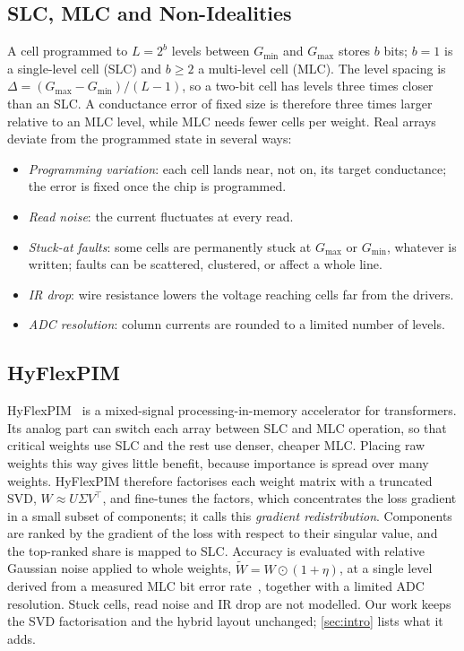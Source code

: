\subsection{SLC, MLC and Non-Idealities}
A cell programmed to $L=2^b$ levels between $G_{\min}$ and $G_{\max}$ stores $b$ bits; $b=1$ is a
single-level cell (SLC) and $b\geq2$ a multi-level cell (MLC). The level spacing is
$\Delta=(G_{\max}-G_{\min})/(L-1)$, so a two-bit cell has levels three times closer than an SLC. A
conductance error of fixed size is therefore three times larger relative to an MLC level, while MLC
needs fewer cells per weight. Real arrays deviate from the programmed state in several ways:
\begin{itemize}
\item \emph{Programming variation}: each cell lands near, not on, its target conductance; the error is
fixed once the chip is programmed.
\item \emph{Read noise}: the current fluctuates at every read.
\item \emph{Stuck-at faults}: some cells are permanently stuck at $G_{\max}$ or $G_{\min}$, whatever
is written; faults can be scattered, clustered, or affect a whole line.
\item \emph{IR drop}: wire resistance lowers the voltage reaching cells far from the drivers.
\item \emph{ADC resolution}: column currents are rounded to a limited number of levels.
\end{itemize}

\subsection{HyFlexPIM}
HyFlexPIM~\cite{song2025hyflexpim} is a mixed-signal processing-in-memory accelerator for
transformers. Its analog part can switch each array between SLC and MLC operation, so that critical
weights use SLC and the rest use denser, cheaper MLC. Placing raw weights this way gives little benefit,
because importance is spread over many weights. HyFlexPIM therefore factorises each weight matrix with a
truncated SVD, $W\approx U\Sigma V^{\top}$, and fine-tunes the factors, which concentrates the loss
gradient in a small subset of components; it calls this \emph{gradient redistribution}. Components are
ranked by the gradient of the loss with respect to their singular value, and the top-ranked share is
mapped to SLC. Accuracy is evaluated with relative Gaussian noise applied to whole weights,
$\tilde W=W\odot(1+\eta)$, at a single level derived from a measured MLC bit error
rate~\cite{fan2024mlc}, together with a limited ADC resolution. Stuck cells, read noise and IR drop are
not modelled. Our work keeps the SVD
factorisation and the hybrid layout unchanged; \cref{sec:intro} lists what it adds.

